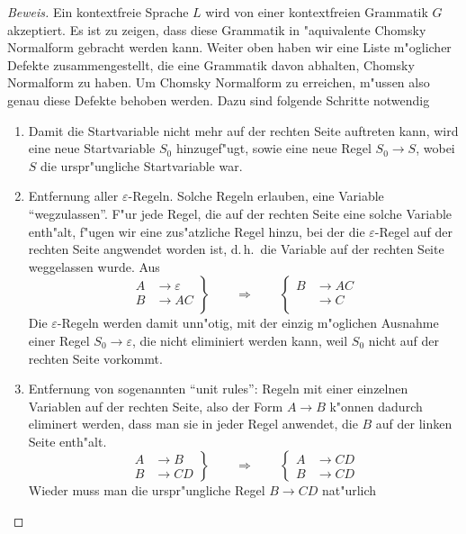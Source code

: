 \begin{proof}[Beweis]
Ein kontextfreie Sprache $L$ wird von einer kontextfreien Grammatik
$G$ akzeptiert. Es ist zu zeigen, dass diese Grammatik in
"aquivalente Chomsky Normalform gebracht werden kann.
Weiter oben haben wir eine Liste
m"oglicher Defekte zusammengestellt, die eine Grammatik davon abhalten,
Chomsky Normalform zu haben. Um Chomsky Normalform zu erreichen,
m"ussen also genau diese Defekte behoben werden.
Dazu sind folgende Schritte notwendig
\begin{enumerate}
\item Damit die Startvariable nicht mehr auf der rechten Seite auftreten
kann, wird eine neue Startvariable $S_0$ hinzugef"ugt, sowie eine
neue Regel
$S_0\to S$, wobei $S$ die urspr"ungliche Startvariable war.
\item Entfernung aller $\varepsilon$-Regeln. Solche Regeln erlauben,
eine Variable ``wegzulassen''. F"ur jede Regel, die auf der rechten
Seite eine solche Variable enth"alt, f"ugen wir eine zus"atzliche
Regel hinzu, bei der die $\varepsilon$-Regel auf der rechten Seite
angwendet worden ist, d.\,h.~die Variable auf der rechten Seite weggelassen
wurde.  Aus
\[
\left.
\begin{aligned}
A&\to\varepsilon\\
B&\to AC\\
\end{aligned}
\right\}
\qquad
\Rightarrow
\qquad
\left\{
\begin{aligned}
B&\to AC\\
&\to C\\
\end{aligned}
\right.
\]
Die $\varepsilon$-Regeln werden damit unn"otig, mit der einzig
m"oglichen Ausnahme einer Regel $S_0\to\varepsilon$, die nicht
eliminiert werden kann, weil $S_0$ nicht auf der rechten Seite
vorkommt.
\item Entfernung von sogenannten ``unit rules'': Regeln mit einer einzelnen Variablen auf der rechten Seite, also 
der Form $A\to B$ k"onnen dadurch eliminert werden, dass man
sie in jeder Regel anwendet, die $B$ auf der linken Seite enth"alt.
\[
\left.
\begin{aligned}
A&\to B\\
B&\to CD
\end{aligned}
\right\}
\qquad\Rightarrow\qquad
\left\{
\begin{aligned}
A&\to CD\\
B&\to CD
\end{aligned}
\right.
\]
Wieder muss man die urspr"ungliche Regel $B\to CD$ nat"urlich

\end{enumerate}
\end{proof}
